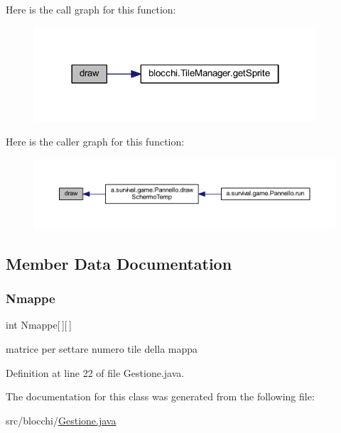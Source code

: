 Here is the call graph for this function\+:
\nopagebreak
\begin{figure}[H]
\begin{center}
\leavevmode
\includegraphics[width=298pt]{classblocchi_1_1_gestione_ae8c972c0fb4fcbc09c2219dd32cbd053_cgraph}
\end{center}
\end{figure}
Here is the caller graph for this function\+:
\nopagebreak
\begin{figure}[H]
\begin{center}
\leavevmode
\includegraphics[width=350pt]{classblocchi_1_1_gestione_ae8c972c0fb4fcbc09c2219dd32cbd053_icgraph}
\end{center}
\end{figure}


\subsection{Member Data Documentation}
\mbox{\label{classblocchi_1_1_gestione_ac67a253aa050f8b036b79e9613b946e9}} 
\subsubsection{\texorpdfstring{Nmappe}{Nmappe}}
{\footnotesize\ttfamily int Nmappe\mbox{[}$\,$\mbox{]}\mbox{[}$\,$\mbox{]}}

matrice per settare numero tile della mappa 

Definition at line 22 of file Gestione.\+java.



The documentation for this class was generated from the following file\+:\begin{DoxyCompactItemize}
\item 
src/blocchi/\hyperlink{_gestione_8java}{Gestione.\+java}\end{DoxyCompactItemize}
